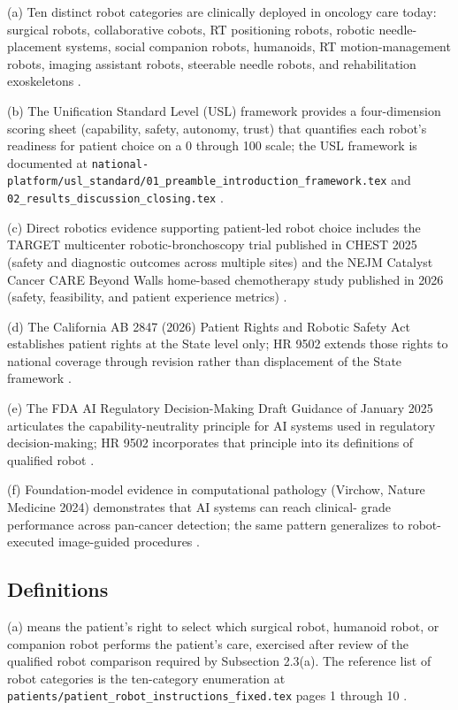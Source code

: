 (a) Ten distinct robot categories are clinically deployed in
oncology care today: surgical robots, collaborative cobots, RT
positioning robots, robotic needle-placement systems, social
companion robots, humanoids, RT motion-management robots, imaging
assistant robots, steerable needle robots, and rehabilitation
exoskeletons \cite{kawchak_2026_18810541}.

(b) The Unification Standard Level (USL) framework provides a
four-dimension scoring sheet (capability, safety, autonomy, trust)
that quantifies each robot's readiness for patient choice on a 0
through 100 scale; the USL framework is documented at
\texttt{national-platform/usl\_standard/01\_preamble\_introduction\_framework.tex}
and \texttt{02\_results\_discussion\_closing.tex}
\cite{kawchak_2026_18778219}.

(c) Direct robotics evidence supporting patient-led robot choice
includes the TARGET multicenter robotic-bronchoscopy trial published
in CHEST 2025 (safety and diagnostic outcomes across multiple sites)
and the NEJM Catalyst Cancer CARE Beyond Walls home-based
chemotherapy study published in 2026 (safety, feasibility, and
patient experience metrics) \cite{target2025robotic_bronchoscopy,
dronca2026cancer_care_beyond_walls}.

(d) The California AB 2847 (2026) Patient Rights and Robotic Safety
Act establishes patient rights at the State level only; HR 9502
extends those rights to national coverage through revision rather
than displacement of the State framework \cite{kawchak_2026_19176370}.

(e) The FDA AI Regulatory Decision-Making Draft Guidance of January
2025 articulates the capability-neutrality principle for AI systems
used in regulatory decision-making; HR 9502 incorporates that
principle into its definitions of qualified robot
\cite{fda_ai_regulatory_decision_draft_2025}.

(f) Foundation-model evidence in computational pathology (Virchow,
Nature Medicine 2024) demonstrates that AI systems can reach clinical-
grade performance across pan-cancer detection; the same pattern
generalizes to robot-executed image-guided procedures
\cite{vorontsov2024virchow}.

\subsection{Definitions}

(a)  means the patient's right to
select which surgical robot, humanoid robot, or companion robot
performs the patient's care, exercised after review of the qualified
robot comparison required by Subsection 2.3(a). The reference list of
robot categories is the ten-category enumeration at
\texttt{patients/patient\_robot\_instructions\_fixed.tex} pages 1
through 10 \cite{kawchak_2026_18810541}.

